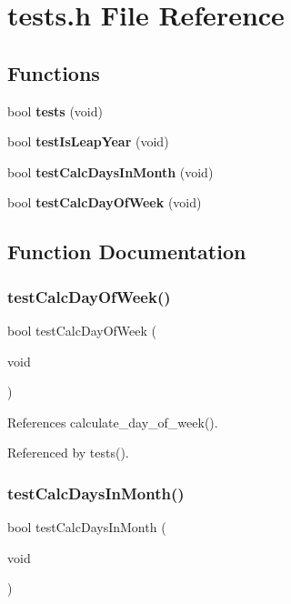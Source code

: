 \section{tests.\+h File Reference}
\label{tests_8h}
\subsection*{Functions}
\begin{DoxyCompactItemize}
\item 
bool \textbf{ tests} (void)
\item 
bool \textbf{ test\+Is\+Leap\+Year} (void)
\item 
bool \textbf{ test\+Calc\+Days\+In\+Month} (void)
\item 
bool \textbf{ test\+Calc\+Day\+Of\+Week} (void)
\end{DoxyCompactItemize}


\subsection{Function Documentation}
\mbox{\label{tests_8h_adaf10b63d8530290dba5512c538b63fb}} 
\subsubsection{test\+Calc\+Day\+Of\+Week()}
{\footnotesize\ttfamily bool test\+Calc\+Day\+Of\+Week (\begin{DoxyParamCaption}\item[{void}]{ }\end{DoxyParamCaption})}



References calculate\+\_\+day\+\_\+of\+\_\+week().



Referenced by tests().

\mbox{\label{tests_8h_a6f865121348bb48d247b872d1ce204db}} 
\subsubsection{test\+Calc\+Days\+In\+Month()}
{\footnotesize\ttfamily bool test\+Calc\+Days\+In\+Month (\begin{DoxyParamCaption}\item[{void}]{ }\end{DoxyParamCaption})}



